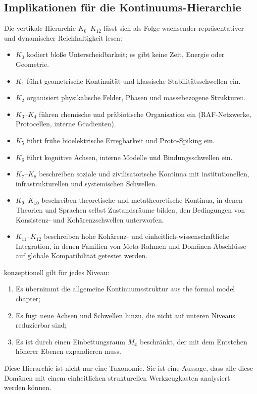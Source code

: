 \subsection{Implikationen für die Kontinuums-Hierarchie}

Die vertikale Hierarchie \(K_0\)–\(K_{12}\) lässt sich als Folge wachsender
repräsentativer und dynamischer Reichhaltigkeit lesen:

\begin{itemize}
    \item \(K_0\) kodiert bloße Unterscheidbarkeit; es gibt keine Zeit,
          Energie oder Geometrie.
    \item \(K_1\) führt geometrische Kontinuität und klassische
          Stabilitätsschwellen ein.
    \item \(K_2\) organisiert physikalische Felder, Phasen und massebezogene
          Strukturen.
    \item \(K_3\)–\(K_4\) führen chemische und präbiotische Organisation ein
          (RAF-Netzwerke, Protocellen, interne Gradienten).
    \item \(K_5\) führt frühe bioelektrische Erregbarkeit und Proto-Spiking ein.
    \item \(K_6\) führt kognitive Achsen, interne Modelle und Bindungsschwellen ein.
    \item \(K_7\)–\(K_8\) beschreiben soziale und zivilisatorische
          Kontinua mit institutionellen, infrastrukturellen und systemischen
          Schwellen.
    \item \(K_9\)–\(K_{10}\) beschreiben theoretische und metatheoretische
          Kontinua, in denen Theorien und Sprachen selbst Zustandsräume bilden,
den Bedingungen von Konsistenz- und Kohärenzschwellen unterworfen.
    \item \(K_{11}\)–\(K_{12}\) beschreiben hohe Kohärenz- und
          einheitlich-wissenschaftliche Integration, in denen Familien von
          Meta-Rahmen und Domänen-Abschlüsse auf globale Kompatibilität
          getestet werden.
\end{itemize}

konzeptionell gilt für jedes Niveau:
\begin{enumerate}
    \item Es übernimmt die allgemeine Kontinuumsstruktur aus the formal model chapter;
    \item Es fügt neue Achsen und Schwellen hinzu, die nicht auf unteren Niveaus
          reduzierbar sind;
    \item Es ist durch einen Einbettungsraum \(M_x\) beschränkt, der mit dem
          Entstehen höherer Ebenen expandieren muss.
\end{enumerate}
Diese Hierarchie ist nicht nur eine Taxonomie.
Sie ist eine Aussage, dass alle diese Domänen mit einem einheitlichen
strukturellen Werkzeugkasten analysiert werden können.

